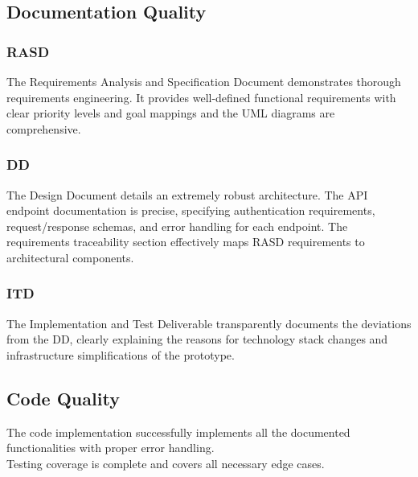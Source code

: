 \subsection{Documentation Quality}

\subsubsection{RASD}
The Requirements Analysis and Specification Document demonstrates thorough requirements engineering. It provides well-defined functional requirements with clear priority levels and goal mappings and the UML diagrams are comprehensive.

\subsubsection{DD}
The Design Document details an extremely robust architecture. The API endpoint documentation is precise, specifying authentication requirements, request/response schemas, and error handling for each endpoint. The requirements traceability section effectively maps RASD requirements to architectural components.

\subsubsection{ITD}
The Implementation and Test Deliverable transparently documents the deviations from the DD, clearly explaining the reasons for technology stack changes and infrastructure simplifications of the prototype.

\subsection{Code Quality}
The code implementation successfully implements all the documented functionalities with proper error handling. \\
Testing coverage is complete and covers all necessary edge cases.\\
